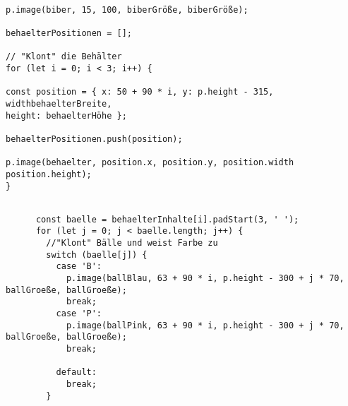 \documentclass{article}
\begin{document}
    \begin{tcolorbox}[colback=gray!30, colframe=white]
        \begin{verbatim}
    
p.image(biber, 15, 100, biberGröße, biberGröße);

behaelterPositionen = [];

// "Klont" die Behälter
for (let i = 0; i < 3; i++) {

const position = { x: 50 + 90 * i, y: p.height - 315, widthbehaelterBreite, 
height: behaelterHöhe };

behaelterPositionen.push(position);

p.image(behaelter, position.x, position.y, position.width
position.height);
}

\end{verbatim}
    \end{tcolorbox}

\vspace{0.5cm}



\vspace{0.5cm}

\vspace{0.5cm}

\vspace{0.5cm}
    \begin{tcolorbox}[colback=gray!30, colframe=white]
        \begin{verbatim}

      const baelle = behaelterInhalte[i].padStart(3, ' ');
      for (let j = 0; j < baelle.length; j++) {
        //"Klont" Bälle und weist Farbe zu
        switch (baelle[j]) {
          case 'B':
            p.image(ballBlau, 63 + 90 * i, p.height - 300 + j * 70, ballGroeße, ballGroeße);
            break;
          case 'P':
            p.image(ballPink, 63 + 90 * i, p.height - 300 + j * 70, ballGroeße, ballGroeße);
            break;

          default:
            break;
        }

\end{verbatim}
    \end{tcolorbox}
\end{document}
